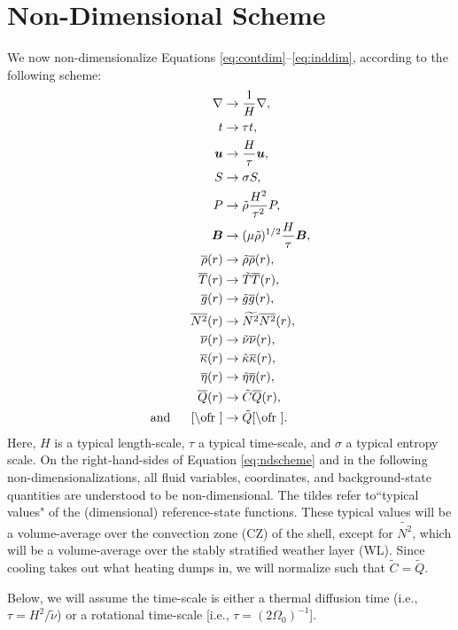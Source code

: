 \documentclass[12pt]{article}
\numberwithin{equation}{section}
\begin{document}
	\section{Non-Dimensional Scheme}
	We now non-dimensionalize Equations \eqref{eq:contdim}--\eqref{eq:inddim}, according to the following scheme:
	\begin{subequations}\label{eq:ndscheme}
	\begin{align}
		\nabla &\rightarrow \frac{1}{H}\nabla,\\
		t &\rightarrow \tau t,\\
		\vecu &\rightarrow \frac{H}{\tau} \vecu,\\
		S &\rightarrow \sigma S,\\
		P &\rightarrow \tilde{\rho} \frac{H^2}{\tau^2} P,\\
		\vecb &\rightarrow (\mu\tilde{\rho})^{1/2}\frac{H}{\tau} \vecb,\\ 
		\rhoref\ofr &\rightarrow \tilde{\rho} \rhoref\ofr, \\
		\tmpref\ofr &\rightarrow \tilde{T} \tmpref\ofr,\\
		\gref\ofr &\rightarrow \tilde{g} \gref\ofr,\\
		\nsqref\ofr &\rightarrow \widetilde{N^2} \nsqref\ofr,\\
		\nuref\ofr &\rightarrow \tilde{\nu}\nuref\ofr,\\
		\kapparef\ofr &\rightarrow \tilde{\kappa}\kapparef\ofr,\\
		 \etaref\ofr &\rightarrow \tilde{\eta}\etaref\ofr,\\ 
		\qref\ofr &\rightarrow \tilde{C} \qref\ofr,\\
		\andd \cref\ofr &\rightarrow \tilde{Q} \cref\ofr.
	\end{align}
	\end{subequations}
	Here, $H$ is a typical length-scale, $\tau$ a typical time-scale, and $\sigma$ a typical entropy scale. On the right-hand-sides of Equation \eqref{eq:ndscheme} and in the following non-dimensionalizations, all fluid variables, coordinates, and background-state quantities are understood to be non-dimensional. The tildes refer to``typical values" of the (dimensional) reference-state functions. These typical values will be a volume-average over the convection zone (CZ) of the shell, except for $\widetilde{N^2}$, which will be a volume-average over the stably stratified weather layer (WL). Since cooling takes out what heating dumps in, we will normalize such that $\tilde{C}=\tilde{Q}$. 
	
	Below, we will assume the time-scale is either a thermal diffusion time (i.e., $\tau=H^2/\tilde{\nu}$) or a rotational time-scale [i.e., $\tau=(2\Omega_0)^{-1}$]. %
	
\end{document}
